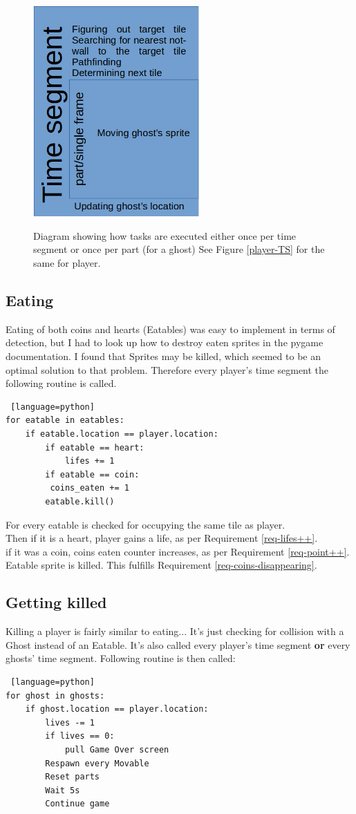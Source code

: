 \documentclass[11pt,a4paper]{report}
\newcommand{\dsubsection}[1]{\FloatBarrier \subsection{#1}}
\newenvironment{img}{
	\begin{center}
		\begin{figure}[H]
			\begin{center}
			
}{
	\end{center}
		\end{figure}
			\end{center}
}
\begin{document}
			\begin{img}
				\includegraphics[width=180pt]{images/ghost-time-segment}\\
				\caption{Diagram showing how tasks are executed either once per time segment or once per part (for a ghost) \newline See Figure \ref{player-TS} for the same for player.}
			\end{img}
			\dsubsection{Eating}
				Eating of both coins and hearts (Eatables) was easy to implement in terms of detection, but I had to look up how to destroy eaten sprites in the pygame documentation. I found that Sprites may be killed, which seemed to be an optimal solution to that problem. Therefore every player's time segment the following routine is called.
				\begin{lstlisting} [language=python]
for eatable in eatables:
	if eatable.location == player.location:
		if eatable == heart:
			lifes += 1
		if eatable == coin:
		 coins_eaten += 1
		eatable.kill()
				\end{lstlisting}
				For every eatable is checked for occupying the same tile as player.\\
				Then if it is a heart, player gains a life, as per Requirement \ref{req-lifes++}.\\
				if it was a coin, coins eaten counter increases, as per Requirement \ref{req-point++}.\\
				Eatable sprite is killed. This fulfills Requirement \ref{req-coins-disappearing}.
			\dsubsection{Getting killed}
				Killing a player is fairly similar to eating... It's just checking for collision with a Ghost instead of an Eatable. It's also called every player's time segment \textbf{or} every ghosts' time segment.
				Following routine is then called:
				\begin{lstlisting} [language=python]
for ghost in ghosts:
	if ghost.location == player.location:
		lives -= 1
		if lives == 0:
			pull Game Over screen
		Respawn every Movable
		Reset parts
		Wait 5s
		Continue game
				\end{lstlisting}
\end{document}
